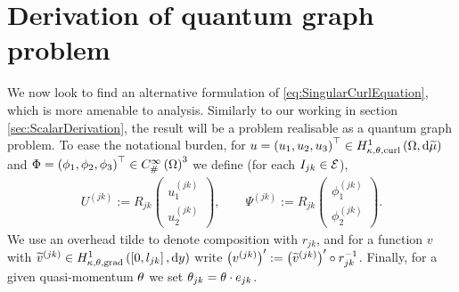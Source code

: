 \section{Derivation of quantum graph problem} \label{sec:3DSystemDerivation}
We now look to find an alternative formulation of \eqref{eq:SingularCurlEquation}, which is more amenable to analysis.
Similarly to our working in section \ref{sec:ScalarDerivation}, the result will be a problem realisable as a quantum graph problem.
To ease the notational burden, for $u=\left( u_1,u_2,u_3 \right)^\top\in H^1_{\kappa,\theta,\mathrm{curl}}\left( \Omega, \mathrm{d}\widetilde{\mu} \right)$ and $\Phi=\left( \phi_1,\phi_2,\phi_3 \right)^\top\in C^{\infty}_{\#}\left( \Omega \right)^3$ we define (for each $I_{jk}\in\mathcal{E}$),
\begin{align*}
	U^{(jk)} := R_{jk} \begin{pmatrix} u_1^{(jk)} \\ u_2^{(jk)} \end{pmatrix},
	\qquad
	\Psi^{(jk)} := R_{jk} \begin{pmatrix} \phi_1^{(jk)} \\ \phi_2^{(jk)} \end{pmatrix}.
\end{align*}
We use an overhead tilde to denote composition with $r_{jk}$, and for a function $v$ with $\widetilde{v}^{(jk)}\in H^1_{\kappa,\theta,\mathrm{grad}}\left( \left[ 0,l_{jk} \right], \mathrm{d}y \right)$ write $\left( v^{(jk)} \right)' := \left( \widetilde{v}^{(jk)} \right)' \circ r_{jk}^{-1}$.
Finally, for a given quasi-momentum $\theta$ we set $\theta_{jk} = \theta\cdot e_{jk}$.

